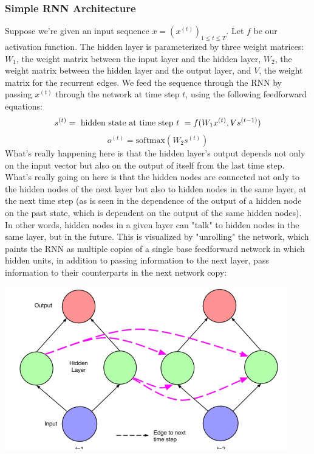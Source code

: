 \documentclass{article}
\begin{document}
\subsubsection{Simple RNN Architecture}
Suppose we're given an input sequence $ x = (x^{(t)})_{1 \leq t \leq T} $. Let $ f $ be our activation function. The hidden layer is parameterized by three weight matrices: $ W_1 $, the weight matrix between the input layer and the hidden layer, $ W_2 $, the weight matrix between the hidden layer and the output layer, and $ V $, the weight matrix for the recurrent edges. We feed the sequence through the RNN by passing $ x^{(t)} $ through the network at time step $ t $, using the following feedforward equations:
$$ s^{(t)} = \text{ hidden state at time step $ t $ } = f(W_1 x^{(t)}, V s^{(t - 1)}) $$
$$ o^{(t)} = \text{softmax}(W_2 s^{(t)}) $$
What's really happening here is that the hidden layer's output depends not only on the input vector but also on the output of itself from the last time step. What's really going on here is that the hidden nodes are connected not only to the hidden nodes of the next layer but also to hidden nodes in the same layer, at the next time step (as is seen in the dependence of the output of a hidden node on the past state, which is dependent on the output of the same hidden nodes). In other words, hidden nodes in a given layer can "talk" to hidden nodes in the same layer, but in the future. This is visualized by "unrolling" the network, which paints the RNN as multiple copies of a single base feedforward network in which hidden units, in addition to passing information to the next layer, pass information to their counterparts in the next network copy:

\begin{center}
    \includegraphics[scale=0.5]{images/unrolled_rnn.png}
\end{center}
\end{document}
